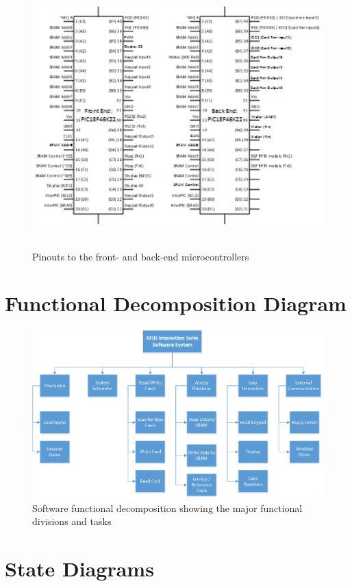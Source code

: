 \documentclass[12pt]{article} %
\begin{document}
\begin{figure}[H]
	\centering
	\includegraphics[height=4in]{images/PinOuts.png}
	\caption{Pinouts to the front- and back-end microcontrollers}
	\label{fig:pinoutDiagram}
\end{figure}

\section{Functional Decomposition Diagram\label{fig:funcDecomp}}

\begin{figure}[H]
	\centering
	\includegraphics[width=\textwidth]{images/funDecomp.png}
	\caption{Software functional decomposition showing the major functional divisions and tasks}
	\label{fig:funDecomp}
\end{figure}

\section{State Diagrams}
\end{document}

